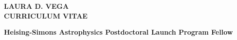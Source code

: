 \documentclass[letter,12pt]{article}
\begin{document}
\pagestyle{fancy}
\fancyhf{}
\renewcommand{\headrulewidth}{0pt}


\begin{center} 
\bfseries{
\LARGE \uppercase{Laura D. Vega} \\
\large \uppercase{Curriculum Vitae}}
\end{center}

\noindent
\begin{center}{\bf Heising-Simons Astrophysics Postdoctoral Launch Program Fellow} \\
\end{center}
\end{document}
